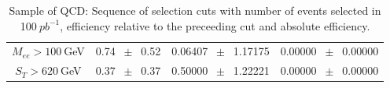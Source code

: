 \begin{table}[htbp]
\begin{center}
\begin{tabular}{|c|c|c|c|}
          $M_{ee}>100~$GeV          &           0.74          $~\pm~$          0.52           &           0.06407          $~\pm~$          1.17175           &           0.00000          $~\pm~$          0.00000          \\          
          $ S_T>620~$GeV           &           0.37          $~\pm~$          0.37           &           0.50000          $~\pm~$          1.22221           &           0.00000          $~\pm~$          0.00000          \\          
          \hline\hline 
\end{tabular} 
\end{center} 
\caption{Sample of QCD: Sequence of selection cuts with number of events selected in 100$~pb^{-1}$, efficiency relative to the preceeding cut and absolute efficiency.} 
\label{tab:} 
\end{table} 


